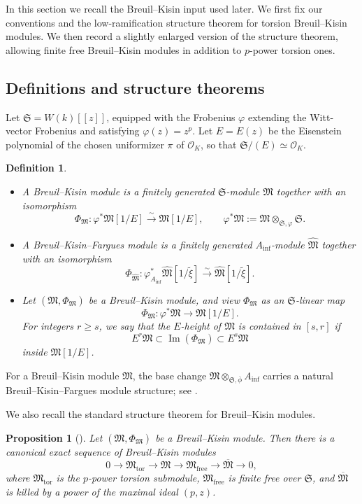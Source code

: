 \documentclass[11pt]{amsart}
\newtheorem{proposition}[lemma]{Proposition}
\newtheorem{definition}[lemma]{Definition}
\numberwithin{equation}{section}
\newcommand{\sO}{\mathcal{O}}
\newcommand{\free}{\operatorname{free}}
\newcommand{\tors}{\operatorname{tor}}
\newcommand{\mf}{\mathfrak}
\newcommand{\fM}{\mf{M}}
\renewcommand{\Im}{\operatorname{Im}}
\newcommand{\mS}{\mf{S}}
\numberwithin{equation}{section}
\newcommand{\ol}{\overline}
\newcommand{\Ainf}{A_{\operatorname{inf}}}
\begin{document}
In this section we recall the Breuil--Kisin input used later.  We first fix
our conventions and the low-ramification structure theorem for torsion
Breuil--Kisin modules.  We then record a slightly enlarged version of the
structure theorem, allowing finite free Breuil--Kisin modules in addition to
$p$-power torsion ones.

\subsection{Definitions and structure theorems}

Let $\mS=W(k)[[z]]$, equipped with the Frobenius $\varphi$ extending the
Witt-vector Frobenius and satisfying $\varphi(z)=z^p$.  Let $E=E(z)$ be the
Eisenstein polynomial of the chosen uniformizer $\pi$ of $\sO_K$, so that
$\mS/(E)\simeq \sO_K$.

\begin{definition}
\begin{itemize}
  \item[(1)] A \emph{Breuil--Kisin module} is a finitely generated
  $\mS$-module $\fM$ together with an isomorphism
  \[
    \Phi_{\fM}:\varphi^*\fM[1/E]
    \xrightarrow{\sim}
    \fM[1/E],
    \qquad
    \varphi^*\fM:=\fM\otimes_{\mS,\varphi}\mS .
  \]

  \item[(2)] A \emph{Breuil--Kisin--Fargues module} is a finitely generated
  $\Ainf$-module $\widehat{\fM}$ together with an isomorphism
  \[
    \Phi_{\widehat{\fM}}:
    \varphi_{\Ainf}^*\widehat{\fM}[1/\tilde{\xi}]
    \xrightarrow{\sim}
    \widehat{\fM}[1/\tilde{\xi}] .
  \]

  \item[(3)] Let $(\fM,\Phi_{\fM})$ be a Breuil--Kisin module, and view
  $\Phi_{\fM}$ as an $\mS$-linear map
  \[
    \Phi_{\fM}:\varphi^*\fM\longrightarrow \fM[1/E].
  \]
  For integers $r\geq s$, we say that the $E$-height of $\fM$ is contained
  in $[s,r]$ if
  \[
    E^r\fM\subset \Im(\Phi_{\fM})\subset E^s\fM
  \]
  inside $\fM[1/E]$.
\end{itemize}
\end{definition}

For a Breuil--Kisin module $\fM$, the base change
$\fM\otimes_{\mS,\ol{\phi}}\Ainf$ carries a natural
Breuil--Kisin--Fargues module structure; see
\cite[Proposition~4.32]{BMS18}.

We also recall the standard structure theorem for Breuil--Kisin modules.

\begin{proposition}[{\cite[Proposition~4.3]{BMS18}}]\label{bkdecomp}
Let $(\fM,\Phi_{\fM})$ be a Breuil--Kisin module.  Then there is a canonical
exact sequence of Breuil--Kisin modules
\[
  0
  \to \fM_{\tors}
  \to \fM
  \to \fM_{\free}
  \to \ol{\fM}
  \to 0,
\]
where $\fM_{\tors}$ is the $p$-power torsion submodule, $\fM_{\free}$ is
finite free over $\mS$, and $\ol{\fM}$ is killed by a power of the maximal
ideal $(p,z)$.
\end{proposition}
\end{document}
